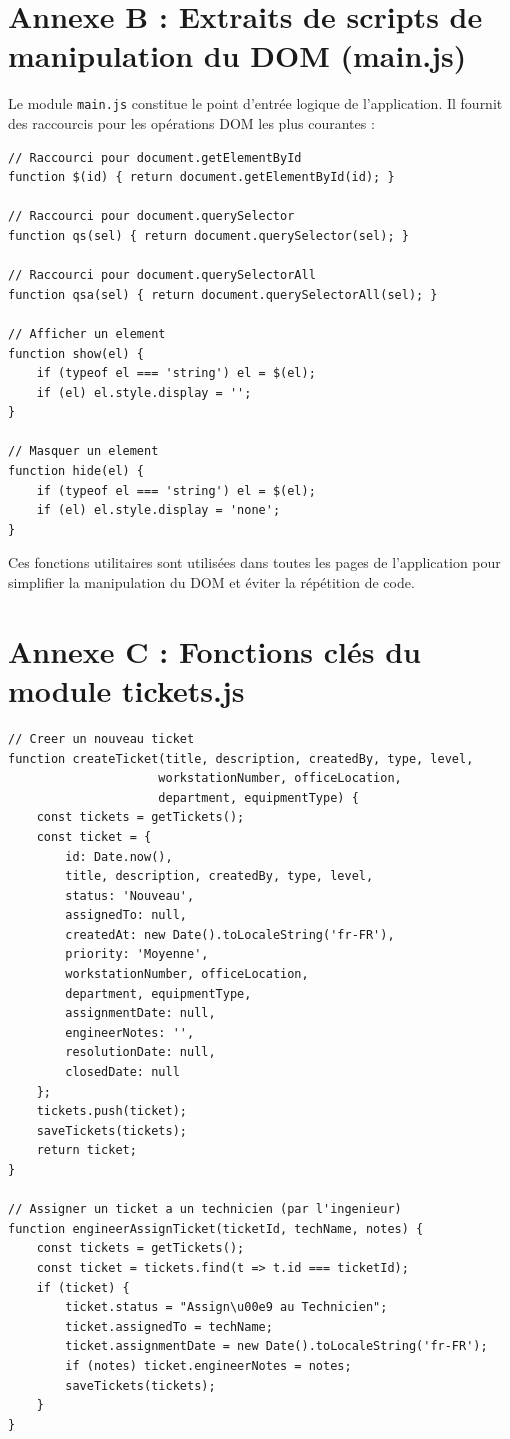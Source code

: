 \documentclass[12pt,a4paper,twoside]{report}
\begin{document}
\section{Annexe B : Extraits de scripts de manipulation du DOM (main.js)}

Le module \texttt{main.js} constitue le point d'entrée logique de l'application. Il fournit des raccourcis pour les opérations DOM les plus courantes :

\begin{lstlisting}[style=jsstyle]
// Raccourci pour document.getElementById
function $(id) { return document.getElementById(id); }

// Raccourci pour document.querySelector
function qs(sel) { return document.querySelector(sel); }

// Raccourci pour document.querySelectorAll
function qsa(sel) { return document.querySelectorAll(sel); }

// Afficher un element
function show(el) {
    if (typeof el === 'string') el = $(el);
    if (el) el.style.display = '';
}

// Masquer un element
function hide(el) {
    if (typeof el === 'string') el = $(el);
    if (el) el.style.display = 'none';
}
\end{lstlisting}

Ces fonctions utilitaires sont utilisées dans toutes les pages de l'application pour simplifier la manipulation du DOM et éviter la répétition de code.

\section{Annexe C : Fonctions clés du module tickets.js}

\begin{lstlisting}[style=jsstyle]
// Creer un nouveau ticket
function createTicket(title, description, createdBy, type, level,
                     workstationNumber, officeLocation,
                     department, equipmentType) {
    const tickets = getTickets();
    const ticket = {
        id: Date.now(),
        title, description, createdBy, type, level,
        status: 'Nouveau',
        assignedTo: null,
        createdAt: new Date().toLocaleString('fr-FR'),
        priority: 'Moyenne',
        workstationNumber, officeLocation,
        department, equipmentType,
        assignmentDate: null,
        engineerNotes: '',
        resolutionDate: null,
        closedDate: null
    };
    tickets.push(ticket);
    saveTickets(tickets);
    return ticket;
}

// Assigner un ticket a un technicien (par l'ingenieur)
function engineerAssignTicket(ticketId, techName, notes) {
    const tickets = getTickets();
    const ticket = tickets.find(t => t.id === ticketId);
    if (ticket) {
        ticket.status = "Assign\u00e9 au Technicien";
        ticket.assignedTo = techName;
        ticket.assignmentDate = new Date().toLocaleString('fr-FR');
        if (notes) ticket.engineerNotes = notes;
        saveTickets(tickets);
    }
}
\end{lstlisting}
\end{document}
